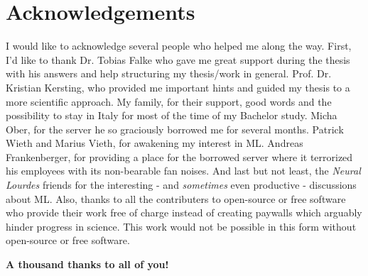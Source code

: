 \documentclass[report,type=bsc,colorback,accentcolor=tud9c,bigchapter,bibliography=totoc,11pt]{tudthesis}
\author{David Marlon Gengenbach}
\begin{document}
  \makethesistitle
  \tableofcontents
  \newpage
  \setcounter{page}{1}
  \abstract{}
  \newpage
  
  \newpage

  \printbibliography[heading=bibintoc]

  \vspace{3cm}
  
  \listoffigures
  
  \vspace{3cm}
  \listoftables
  
  \newpage
  \section*{Acknowledgements}
  I would like to acknowledge several people who helped me along the way.
  First, I'd like to thank Dr. Tobias Falke who gave me great support during the thesis with his answers and help structuring my thesis/work in general.
  Prof. Dr. Kristian Kersting, who provided me important hints and guided my thesis to a more scientific approach.
  My family, for their support, good words and the possibility to stay in Italy for most of the time of my Bachelor study.
  Micha Ober, for the server he so graciously borrowed me for several months.
  Patrick Wieth and Marius Vieth, for awakening my interest in ML.
  Andreas Frankenberger, for providing a place for the borrowed server where it terrorized his employees with its non-bearable fan noises.
  And last but not least, the \textit{Neural Lourdes} friends for the interesting - and \textit{sometimes} even productive - discussions about ML.
  Also, thanks to all the contributers to open-source or free software who provide their work free of charge instead of creating paywalls which arguably hinder progress in science.
  This work would not be possible in this form without open-source or free software.
  
  \vspace{0.5cm}
  \centering\textsf{\textbf{A thousand thanks to all of you!}}
\end{document}

